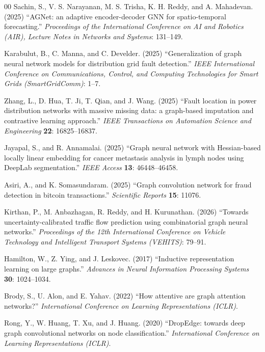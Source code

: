 \documentclass[3p,times,procedia]{elsarticle}
\begin{document}
\begin{thebibliography}{00}
Sachin, S., V. S. Narayanan, M. S. Trisha, K. H. Reddy, and A. Mahadevan.
(2025) ``AGNet: an adaptive encoder-decoder GNN for spatio-temporal
forecasting.'' {\it Proceedings of the International Conference on AI and
Robotics (AIR), Lecture Notes in Networks and Systems}: 131--149.

Karabulut, B., C. Manna, and C. Develder. (2025)
``Generalization of graph neural network models for distribution
grid fault detection.'' {\it IEEE International Conference on
Communications, Control, and Computing Technologies for Smart Grids
(SmartGridComm)}: 1--7.

Zhang, L., D. Hua, T. Ji, T. Qian, and J. Wang. (2025) ``Fault location
in power distribution networks with massive missing data: a graph-based
imputation and contrastive learning approach.'' {\it IEEE Transactions
on Automation Science and Engineering} {\bf 22}: 16825--16837.

Jayapal, S., and R. Annamalai. (2025) ``Graph neural network with
Hessian-based locally linear embedding for cancer metastasis analysis in
lymph nodes using DeepLab segmentation.'' {\it IEEE Access} {\bf 13}:
46448--46458.

Asiri, A., and K. Somasundaram. (2025) ``Graph convolution network for
fraud detection in bitcoin transactions.'' {\it Scientific Reports}
{\bf 15}: 11076.

Kirthan, P., M. Anbazhagan, R. Reddy, and H. Kurunathan. (2026)
``Towards uncertainty-calibrated traffic flow prediction using
combinatorial graph neural networks.'' {\it Proceedings of the 12th
International Conference on Vehicle Technology and Intelligent Transport
Systems (VEHITS)}: 79--91.

Hamilton, W., Z. Ying, and J. Leskovec. (2017) ``Inductive
representation learning on large graphs.'' {\it Advances in Neural
Information Processing Systems} {\bf 30}: 1024--1034.

Brody, S., U. Alon, and E. Yahav. (2022) ``How attentive are
graph attention networks?'' {\it International Conference on Learning
Representations (ICLR)}.

Rong, Y., W. Huang, T. Xu, and J. Huang. (2020)
``DropEdge: towards deep graph convolutional networks on node
classification.'' {\it International Conference on Learning
Representations (ICLR)}.

\end{thebibliography}
\end{document}
